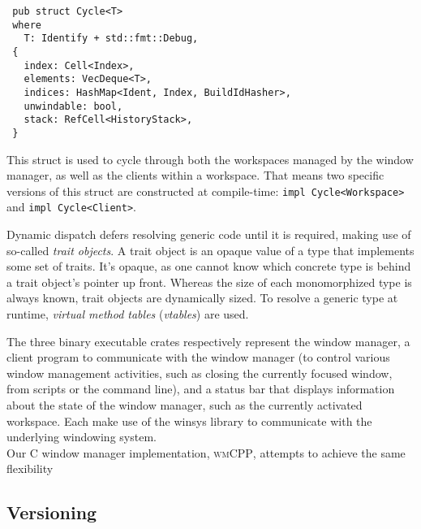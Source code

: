 \begin{verbatim}
 pub struct Cycle<T>
 where
   T: Identify + std::fmt::Debug,
 {
   index: Cell<Index>,
   elements: VecDeque<T>,
   indices: HashMap<Ident, Index, BuildIdHasher>,
   unwindable: bool,
   stack: RefCell<HistoryStack>,
 }
\end{verbatim}

This struct is used  to cycle through both the workspaces  managed by the window
manager, as  well as  the clients  within a workspace.  That means  two specific
versions of this struct  are constructed at compile-time: \texttt{impl
Cycle<Workspace>} and \texttt{impl Cycle<Client>}.

Dynamic dispatch defers resolving generic code until it is required,
making use  of so-called  \textit{trait objects}.  A trait  object is  an opaque
value of a type  that implements some set of traits. It's  opaque, as one cannot
know which  concrete type is behind  a trait object's pointer  up front. Whereas
the  size  of  each  monomorphized  type is  always  known,  trait  objects  are
dynamically sized. To resolve a  generic type at runtime, \textit{virtual method
tables} (\textit{vtables}) are used.


The three binary executable crates  respectively represent the window manager, a
client program to communicate with the window manager (to control various window
management  activities,  such as  closing  the  currently focused  window,  from
scripts or the  command line), and a status bar  that displays information about
the state of the window manager, such as the currently activated workspace. Each
make use  of the  winsys library  to communicate  with the  underlying windowing
system.\\

Our  C\text{++}  window  manager  implementation,  \textsc{wmCPP},  attempts  to
achieve the same flexibility

\subsection{Versioning}
{ \textcolor{gray}\blindtext }
